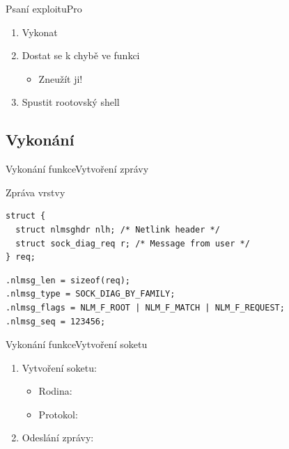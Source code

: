 \begin{frame}{Psaní exploitu}{Pro }

  \begin{enumerate}
    \item Vykonat 

    \item Dostat se k chybě ve funkci
    \begin{itemize}
      \item Zneužít ji!
    \end{itemize}

    \item Spustit rootovský shell
  \end{enumerate}

\end{frame}

\subsection{Vykonání }
\frame{\subsectionpage}

\begin{frame}[fragile]{Vykonání funkce}{Vytvoření zprávy}

\begin{block}{Zpráva  vrstvy}
\begin{lstlisting}
struct {
  struct nlmsghdr nlh; /* Netlink header */
  struct sock_diag_req r; /* Message from user */
} req;
\end{lstlisting}
\end{block}

\pause

\begin{block}{}
\begin{lstlisting}
.nlmsg_len = sizeof(req);
.nlmsg_type = SOCK_DIAG_BY_FAMILY;
.nlmsg_flags = NLM_F_ROOT | NLM_F_MATCH | NLM_F_REQUEST;
.nlmsg_seq = 123456;
\end{lstlisting}
\end{block}

\end{frame}

\begin{frame}[fragile]{Vykonání funkce}{Vytvoření soketu}

  \begin{enumerate}
    \item Vytvoření soketu: 
    \begin{itemize}
      \item Rodina: 
      \item Protokol: 
    \end{itemize}

    \item Odeslání zprávy: 
  \end{enumerate}

\end{frame}

